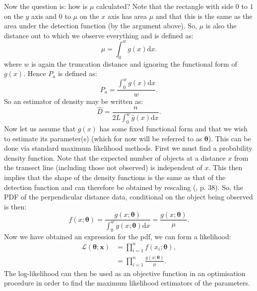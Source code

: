 Now the question is: how is $\mu$ calculated? Note that the rectangle with side $0$ to $1$ on the $y$ axis and $0$ to $\mu$ on the $x$ axis has area $\mu$ and that this is the same as the area under the detection function (by the argument above). So, $\mu$ is also the distance out to which we observe everything and is defined as:
\begin{equation}
\mu = \int_0^w g(x) \text{d}x.
\label{ds-lt-mu-def}
\end{equation}
where $w$ is again the truncation distance and ignoring the functional form of $g(x)$. Hence $P_a$ is defined as:
\begin{equation*}
P_a = \frac{\int_0^w g(x) \text{d}x}{w}.
\end{equation*}
So an estimator of density may be written as:
\begin{equation*}
\hat{D}=\frac{n}{2L \int_0^w \hat{g}(x) \text{d}x}.
\end{equation*}
Now let us assume that $g(x)$ has some fixed functional form and that we wish to estimate its parameter(s) (which for now will be referred to as $\bm{\theta}$). This can be done via standard maximum likelihood methods. First we must find a probability density function. Note that the expected number of objects at a distance $x$ from the transect line (including those not observed) is independent of $x$. This then implies that the shape of the density functions is the same as that of the detection function and can therefore be obtained by rescaling (\cite{IDS}, p. 38). So, the PDF of the perpendicular distance data, conditional on the object being observed is then:
\begin{equation}
f(x;\bm{\theta}) = \frac{g(x;\bm{\theta})}{\int_0^w g(x;\bm{\theta}) \text{d}x} = \frac{g(x;\bm{\theta})}{\mu}.
\end{equation}
Now we have obtained an expression for the pdf, we can form a likelihood:
\begin{align}
\mathcal{L}(\bm{\theta}; \bm{x}) &= \prod_{i=1}^n f(x_i;\bm{\theta}),\\
&= \prod_{i=1}^n \frac{g(x;\bm{\theta})}{\mu}.
\label{ds-lt-likelihood}
\end{align}
The log-likelihood can then be used as an objective function in an optimisation procedure in order to find the maximum likelihood estimators of the parameters.

